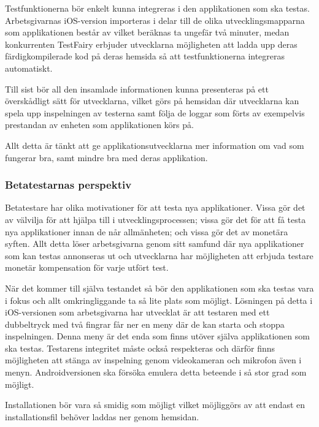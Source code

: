 Testfunktionerna bör enkelt kunna integreras i den applikationen som ska testas. Arbetsgivarnas iOS-version importeras i delar till de olika utvecklingsmapparna som applikationen består av vilket beräknas ta ungefär två minuter, medan konkurrenten TestFairy erbjuder utvecklarna möjligheten att ladda upp deras färdigkompilerade kod på deras hemsida så att testfunktionerna integreras automatiskt. 

Till sist bör all den insamlade informationen kunna presenteras på ett överskådligt sätt för utvecklarna, vilket görs på hemsidan där utvecklarna kan spela upp inspelningen av testerna samt följa de loggar som förts av exempelvis prestandan av enheten som applikationen körs på. 

Allt detta är tänkt att ge applikationsutvecklarna mer information om vad som fungerar bra, samt mindre bra med deras applikation. 

\subsubsection{Betatestarnas perspektiv}
Betatestare har olika motivationer för att testa nya applikationer. Vissa gör det av välvilja för att hjälpa till i utvecklingsprocessen; vissa gör det för att få testa nya applikationer innan de når allmänheten; och vissa gör det av monetära syften. Allt detta löser arbetsgivarna genom sitt samfund där nya applikationer som kan testas annonseras ut och utvecklarna har möjligheten att erbjuda testare monetär kompensation för varje utfört test. 

När det kommer till själva testandet så bör den applikationen som ska testas vara i fokus och allt omkringliggande ta så lite plats som möjligt. Lösningen på detta i iOS-versionen som arbetsgivarna har utvecklat är att testaren med ett dubbeltryck med två fingrar får ner en meny där de kan starta och stoppa inspelningen. Denna meny är det enda som finns utöver själva applikationen som ska testas. Testarens integritet måste också respekteras och därför finns möjligheten att stänga av inspelning genom videokameran och mikrofon även i menyn. Androidversionen ska försöka emulera detta beteende i så stor grad som möjligt. 

Installationen bör vara så smidig som möjligt vilket möjliggörs av att endast en installationsfil behöver laddas ner genom hemsidan. 
